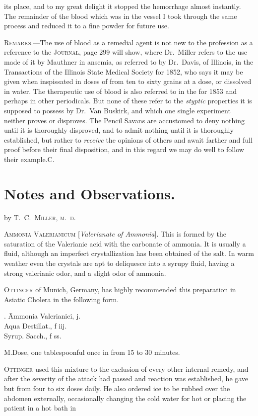 its place, and to my great delight it stopped the hemorrhage almost
instantly. The remainder of the blood which was in the vessel I took
through the same process and reduced it to a fine powder for future use.

\textsc{Remarks}.---The use of blood as a remedial agent is not new to the
profession as a reference to the \textsc{Journal}, page 299 will show, where
Dr.\ Miller refers to the use made of it by Mauthner in ansemia, as
referred to by Dr.\ Davis, of Illinois, in the Transactions of the Illinois
State Medical Society for 1852, who says it may be given when inspissated
in doses of from ten to sixty grains at a dose, or dissolved in
water. The therapeutic use of blood is also referred to in the 
for 1853 and perhaps in other periodicals. But none of
these refer to the \emph{styptic} properties it is supposed to possess by Dr.\ Van
Buskirk, and which one single experiment neither proves or disproves.
The Pencil Savans are accustomed to deny nothing until it is
thoroughly disproved, and to admit nothing until it is thoroughly established,
but rather to \emph{receive} the opinions of others and await farther
and full proof before their final disposition, and in this regard we may
do well to follow their example.\hfill{}C.

\section*{Notes and Observations.}

by \textsc{T.\ C.\ Miller, m.\ d.}

\textsc{Ammonia Valerianicum} [\emph{Valerianate of Ammonia}]. This is formed
by the saturation of the Valerianic acid with the carbonate of ammonia.
It is usually a fluid, although an imperfect crystallization has been obtained
of the salt. In warm weather even the crystals are apt to deliquesce
into a syrupy fluid, having a strong valerianic odor, and a
slight odor of ammonia.

\textsc{Ottinger} of Munich, Germany, has highly recommended this preparation
in Asiatic Cholera in the following form.

\begin{center}
\begin{tabbing}
  \prescription. \= Ammonia Valerianici, \scruple j. \\
    \> Aqua Destillat., f \ounce iij. \\
    \> Syrup. Sacch., f \ounce ss.
\end{tabbing}
\end{center}

M.\quad{}Dose, one tablespoonful once in from 15 to 30 minutes.

\textsc{Ottinger} used this mixture to the exclusion of every other internal
remedy, and after the severity of the attack had passed and reaction
was established, he gave but from four to six doses daily. He also
ordered ice to be rubbed over the abdomen externally, occasionally
changing the cold water for hot or placing the patient in a hot bath in\endinput
